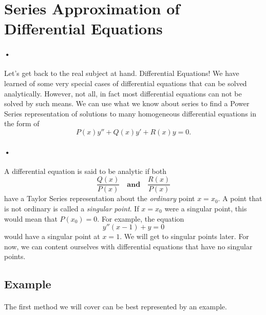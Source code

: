 \documentclass[font =22]{report}
\begin{document}
\section{Series Approximation of Differential Equations}
\paragraph{•}
Let's get back to the real subject at hand. Differential Equations! We have learned of  some very special cases of differential equations that can be solved analytically. However, not all, in fact most differential equations can not be solved by such means. We can use what we know about series to find a Power Series representation of solutions to many homogeneous differential equations in the form of 
\[
P(x)y''+Q(x)y'+R(x)y = 0.
\] 
\paragraph{•}
A differential equation is said to be analytic if both 
\[
\frac{Q(x)}{P(x)} \quad \textbf{and} \quad \frac{R(x)}{P(x)}
\]
have a Taylor Series representation about the \textit{ordinary} point $x=x_0$. A point that is not ordinary is called a \textit{singular point}. If $x=x_0$ were a singular point, this would mean that $P(x_0) = 0$. For example, the equation 
\[
y''(x-1)+y = 0
\]
would have a singular point at $x=1$. We will get to singular points later. For now, we can content ourselves with differential equations that have no singular points.
\subsection*{Example}
\paragraph{}
The first method we will cover can be best represented by an example.
\end{document}
